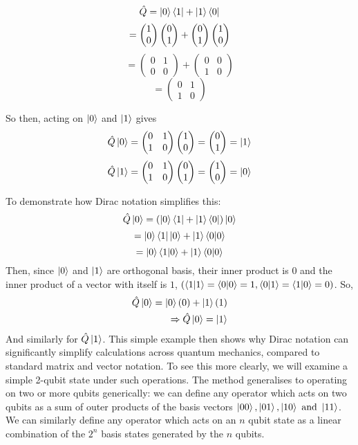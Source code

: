 \begin{example}
$$  \hat{Q} = \ket{0} \bra{1} + \ket{1} \langle0| $$
 $$ = \left(\begin{matrix}1\\0\end{matrix}\right) \left(\begin{matrix}0\\1\end{matrix}\right) + \left(\begin{matrix}0\\1\end{matrix}\right)\left(\begin{matrix}1\\0\end{matrix}\right) $$
 $$ = \begin{pmatrix}
 0 & 1 \\
 0 & 0 \end{pmatrix}  + 
 \begin{pmatrix}
 0&0 \\ 1 &0 
 \end{pmatrix} $$
 $$
 = 
 \begin{pmatrix}
 0&1 \\ 
 1&0
 \end{pmatrix} $$
 
 So then, acting on $\ket{0}$ and $\ket{1}$ gives
 $$ \hat{Q}\ket{0} = \begin{pmatrix} 0&1\\1&0 \end{pmatrix} \left(\begin{matrix}1\\0\end{matrix}\right) = \left(\begin{matrix}0\\1\end{matrix}\right) = \ket{1} $$
 $$ \hat{Q}\ket{1} = \begin{pmatrix} 0&1\\1&0 \end{pmatrix} \left(\begin{matrix}0\\1\end{matrix}\right) = \left(\begin{matrix}1\\0\end{matrix}\right) = \ket{0} $$
\end{example}
To demonstrate how Dirac notation simplifies this:
$$ \hat{Q}\ket{0} = (\ket{0} \bra{1} + \ket{1} \langle0|) \ket{0} $$
$$ = \ket{0} \bra{1} \ket{0} + \ket{1} \braket{0|0} $$
$$ = \ket{0} \braket{ 1 | 0} + \ket{1} \braket{0 | 0} $$
Then, since $\ket{0}$ and $\ket{1}$ are orthogonal basis, their inner product is $0$ and the inner product of a vector with itself is $1$, 
    $\left( \braket{1|1} = \braket{0|0} = 1, \braket{0|1} = \braket{1|0} =0\right)$. 
    So,
\begin{equation}
    \begin{split}
    \hat{Q}\ket{0} = \ket{0} (0) + \ket{1}(1) 
    \\ \Rightarrow \hat{Q}\ket{0} = \ket{1} 
    \end{split}
\end{equation}
And similarly for $\hat{Q}\ket{1}$. 
This simple example then shows why Dirac notation can significantly simplify calculations across quantum mechanics, 
    compared to standard matrix and vector notation. 
    To see this more clearly, we will examine a simple 2-qubit state under such operations. 
    The method generalises to operating on two or more qubits generically: 
    we can define any operator which acts on two qubits as a sum of outer products of the basis vectors $ \ket{00}, \ket{01}, \ket{10} \ \text{and} \ \ket{11}$. 
We can similarly define any operator which acts on an $n$ qubit state as a linear combination of the $2^n$ basis states generated by the $n$ qubits. 


